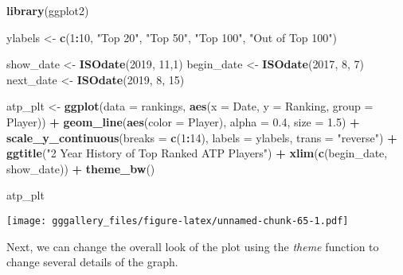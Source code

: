 \documentclass[]{book}
\newenvironment{Shaded}{\begin{snugshade}}{\end{snugshade}}
\newcommand{\DataTypeTok}[1]{\textcolor[rgb]{0.13,0.29,0.53}{#1}}
\newcommand{\DecValTok}[1]{\textcolor[rgb]{0.00,0.00,0.81}{#1}}
\newcommand{\FloatTok}[1]{\textcolor[rgb]{0.00,0.00,0.81}{#1}}
\newcommand{\KeywordTok}[1]{\textcolor[rgb]{0.13,0.29,0.53}{\textbf{#1}}}
\newcommand{\NormalTok}[1]{#1}
\newcommand{\OperatorTok}[1]{\textcolor[rgb]{0.81,0.36,0.00}{\textbf{#1}}}
\newcommand{\StringTok}[1]{\textcolor[rgb]{0.31,0.60,0.02}{#1}}
\begin{document}
\begin{Shaded}
\begin{Highlighting}[]
\KeywordTok{library}\NormalTok{(ggplot2)}


\NormalTok{ylabels <-}\StringTok{ }\KeywordTok{c}\NormalTok{(}\DecValTok{1}\OperatorTok{:}\DecValTok{10}\NormalTok{, }\StringTok{"Top 20"}\NormalTok{, }\StringTok{"Top 50"}\NormalTok{, }\StringTok{"Top 100"}\NormalTok{, }\StringTok{"Out of Top 100"}\NormalTok{)}


\NormalTok{show_date <-}\StringTok{ }\KeywordTok{ISOdate}\NormalTok{(}\DecValTok{2019}\NormalTok{, }\DecValTok{11}\NormalTok{,}\DecValTok{1}\NormalTok{)}
\NormalTok{begin_date <-}\StringTok{ }\KeywordTok{ISOdate}\NormalTok{(}\DecValTok{2017}\NormalTok{, }\DecValTok{8}\NormalTok{, }\DecValTok{7}\NormalTok{)}
\NormalTok{next_date <-}\StringTok{ }\KeywordTok{ISOdate}\NormalTok{(}\DecValTok{2019}\NormalTok{, }\DecValTok{8}\NormalTok{, }\DecValTok{15}\NormalTok{)}


\NormalTok{atp_plt <-}\StringTok{ }\KeywordTok{ggplot}\NormalTok{(}\DataTypeTok{data =}\NormalTok{ rankings, }\KeywordTok{aes}\NormalTok{(}\DataTypeTok{x =}\NormalTok{ Date, }\DataTypeTok{y =}\NormalTok{ Ranking, }\DataTypeTok{group =}\NormalTok{ Player)) }\OperatorTok{+}\StringTok{ }
\StringTok{  }\KeywordTok{geom_line}\NormalTok{(}\KeywordTok{aes}\NormalTok{(}\DataTypeTok{color =}\NormalTok{ Player), }\DataTypeTok{alpha =} \FloatTok{0.4}\NormalTok{, }\DataTypeTok{size =} \FloatTok{1.5}\NormalTok{) }\OperatorTok{+}
\StringTok{  }\KeywordTok{scale_y_continuous}\NormalTok{(}\DataTypeTok{breaks =} \KeywordTok{c}\NormalTok{(}\DecValTok{1}\OperatorTok{:}\DecValTok{14}\NormalTok{), }\DataTypeTok{labels =}\NormalTok{ ylabels, }\DataTypeTok{trans =} \StringTok{"reverse"}\NormalTok{) }\OperatorTok{+}\StringTok{ }
\StringTok{  }\KeywordTok{ggtitle}\NormalTok{(}\StringTok{"2 Year History of Top Ranked ATP Players"}\NormalTok{) }\OperatorTok{+}\StringTok{ }
\StringTok{  }\KeywordTok{xlim}\NormalTok{(}\KeywordTok{c}\NormalTok{(begin_date, show_date)) }\OperatorTok{+}
\StringTok{  }\KeywordTok{theme_bw}\NormalTok{() }

\NormalTok{atp_plt}
\end{Highlighting}
\end{Shaded}

\texttt{[image: gggallery\_files/figure-latex/unnamed-chunk-65-1.pdf]}

Next, we can change the overall look of the plot using the \emph{theme} function to change several
details of the graph.
\end{document}
